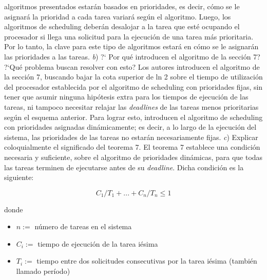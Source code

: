 algoritmos presentados estar\'an basados en prioridades, es decir, c\'omo se le asignar\'a la prioridad a cada tarea variar\'a seg\'un el algoritmo. Luego, los algoritmos
de scheduling deber\'an desalojar a la tarea que est\'e ocupando el procesador si llega una solicitud para la ejecuci\'on de una
tarea m\'as prioritaria. Por lo tanto, la clave para este tipo de algoritmos estar\'a en c\'omo se le asignar\'an las prioridades a las tareas.
\newline
\newline
\textit{b}) ?` Por qu\'e introducen el algoritmo de la secci\'on 7? ?`Qu\'e problema buscan resolver con esto?
\newline
\newline
Los autores introducen el algoritmo de la secci\'on 7, buscando bajar la cota superior de ln 2 sobre el tiempo de utilizaci\'on del procesador establecida 
por el algoritmo de scheduling con prioridades fijas, sin tener que asumir ninguna hip\'otesis extra para los tiempos de ejecuci\'on de las tareas, ni tampoco 
necesitar relajar las \textit{deadlines} de las tareas menos prioritarias seg\'un el esquema anterior. Para lograr esto, introducen el algoritmo de 
scheduling con prioridades asignadas din\'amicamente; es decir, a lo largo de la ejecuci\'on del sistema, las prioridades de las tareas no estar\'an
necesariamente fijas.
\newline
\newline
\textit{c}) Explicar coloquialmente el significado del teorema 7.
\newline
\newline
El teorema 7 establece una condici\'on necesaria y suficiente, sobre el algoritmo de prioridades din\'amicas, para que todas las tareas terminen de ejecutarse
antes de su \textit{deadline}. Dicha condici\'on es la siguiente:

\begin{equation*}
 C_{1}/T_{1} + ... + C_{n}/T_{n} \leq 1
\end{equation*}

donde
\begin{itemize}
  \item $n:=$ n\'umero de tareas en el sistema
  \item $C_{i}:=$ tiempo de ejecuci\'on de la tarea i\'esima
  \item $T_{i}:=$ tiempo entre dos solicitudes consecutivas por la tarea i\'esima (tambi\'en llamado per\'iodo)
\end{itemize}

